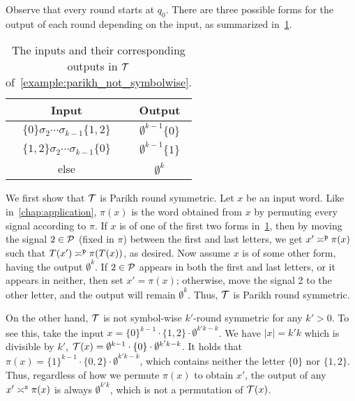 \begin{example}
Observe that every round starts at $q_0$. There are three possible forms for the output of each round depending on the input, as summarized in~\cref{tab:example_parikh_not_symbolwise}.

\begin{table}[!htb]
    \centering
    \caption{The inputs and their corresponding outputs in $\cT$ of~\cref{example:parikh_not_symbolwise}.}
    \vspace{2mm}
    \def\arraystretch{1.3}
    \begin{tabular}{c|c}
        Input & Output \\
        \hline \hline
        $\{0\}\sigma_2\cdots \sigma_{k-1}\{1,2\}$ & $\emptyset^{k-1} \{0\}$ \\
        \hline
        $\{1,2\}\sigma_2\cdots \sigma_{k-1}\{0\}$ & $\emptyset^{k-1} \{1\}$ \\
        \hline
        else & $\emptyset^k$ \\
    \end{tabular}
    \label{tab:example_parikh_not_symbolwise}
\end{table}

We first show that $\cT$ is Parikh round symmetric. Let $x$ be an input word.
Like in~\cref{chap:application}, $\pi(x)$ is the word obtained from $x$ by permuting every signal according to $\pi$.
If $x$ is of one of the first two forms in~\cref{tab:example_parikh_not_symbolwise}, then by moving the signal $2\in \cP$ (fixed in $\pi$) between the first and last letters, we get $x'\reqtype[]{p} \pi(x)$ such that $T(x')\reqtype[]{p} \pi(T(x))$, as desired. Now assume $x$ is of some other form, having the output $\emptyset^k$. If $2\in \cP$ appears in both the first and last letters, or it appears in neither, then set $x'=\pi(x)$; otherwise, move the signal 2 to the other letter, and the output will remain $\emptyset^k$. Thus, $\cT$ is Parikh round symmetric.

On the other hand, $\cT$ is not symbol-wise $k'$-round symmetric for any $k'>0$. To see this, take the input $x=\{0\}^{k-1}\cdot\{1,2\}\cdot\emptyset^{k'k-k}$. We have $|x|=k'k$ which is divisible by $k'$, $\cT(x)=\emptyset^{k-1}\cdot\{0\}\cdot\emptyset^{k'k-k}$. It holds that $\pi(x)=\{1\}^{k-1}\cdot\{0,2\}\cdot\emptyset^{k'k-k}$, which contains neither the letter $\{0\}$ nor $\{1,2\}$. Thus, regardless of how we permute $\pi(x)$ to obtain $x'$, the output of any $x'\reqtype[]{s}\pi(x)$ is always $\emptyset^{k'k}$, which is not a permutation of $\cT(x)$.


\end{example}
